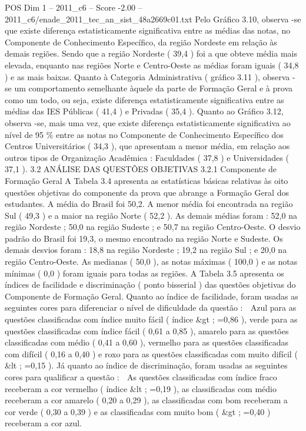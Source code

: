 \begin{textsample}{POS Dim 1 – 2011\_c6 – Score -2.00 – 2011\_c6/enade\_2011\_tec\_an\_sist\_48a2669c01.txt}
Pelo Gráfico 3.10, observa -se que existe diferença estatisticamente significativa entre as médias das notas, no Componente de Conhecimento Específico, da região Nordeste em relação às demais regiões.
Sendo que a região Nordeste ( 39,4 ) foi a que obteve média mais elevada, enquanto nas regiões Norte e Centro-Oeste as médias foram iguais ( 34,8 ) e as mais baixas.
Quanto à Categoria Administrativa ( gráfico 3.11 ), observa -se um comportamento semelhante àquele da parte de Formação Geral e à prova como um todo, ou seja, existe diferença estatisticamente significativa entre as médias das IES Públicas ( 41,4 ) e Privadas ( 35,4 ).
Quanto ao Gráfico 3.12, observa -se, mais uma vez, que existe diferença estatisticamente significativa ao nível de 95 \% entre as notas no Componente de Conhecimento Específico dos Centros Universitários ( 34,3 ), que apresentam a menor média, em relação aos outros tipos de Organização Acadêmica : Faculdades ( 37,8 ) e Universidades ( 37,1 ). 3.2 ANÁLISE DAS QUESTÕES OBJETIVAS 3.2.1 Componente de Formação Geral A Tabela 3.4 apresenta as estatísticas básicas relativas às oito questões objetivas do componente da prova que abrange a Formação Geral dos estudantes.
A média do Brasil foi 50,2.
A menor média foi encontrada na região Sul ( 49,3 ) e a maior na região Norte ( 52,2 ).
As demais médias foram : 52,0 na região Nordeste ; 50,0 na região Sudeste ; e 50,7 na região Centro-Oeste.
O desvio padrão do Brasil foi 19,3, o mesmo encontrado na região Norte e Sudeste.
Os demais desvios foram : 18,8 na região Nordeste ; 19,2 na região Sul ; e 20,0 na região Centro-Oeste.
As medianas ( 50,0 ), as notas máximas ( 100,0 ) e as notas mínimas ( 0,0 ) foram iguais para todas as regiões.
A Tabela 3.5 apresenta os índices de facilidade e discriminação ( ponto bisserial ) das questões objetivas do Componente de Formação Geral.
Quanto ao índice de facilidade, foram usadas as seguintes cores para diferenciar o nível de dificuldade da questão :  Azul para as questões classificadas com índice muito fácil ( índice \&gt ; =0,86 ), verde para as questões classificadas com índice fácil ( 0,61 a 0,85 ), amarelo para as questões classificadas com médio ( 0,41 a 0,60 ), vermelho para as questões classificadas com difícil ( 0,16 a 0,40 ) e roxo para as questões classificadas com muito difícil ( \&lt ; =0,15 ).
Já quanto ao índice de discriminação, foram usadas as seguintes cores para qualificar a questão :  As questões classificadas com índice fraco receberam a cor vermelho ( índice \&lt ; =0,19 ), as classificadas com médio receberam a cor amarelo ( 0,20 a 0,29 ), as classificadas com bom receberam a cor verde ( 0,30 a 0,39 ) e as classificadas com muito bom ( \&gt ; =0,40 ) receberam a cor azul.

\end{textsample}
